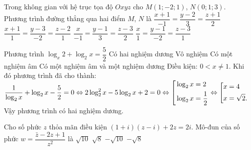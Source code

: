 \begin{ex}%
Trong không gian với hệ trục tọa độ $Oxyz$ cho $M\left(1;-2;1\right)$, $N\left( 0;1;3\right)$. Phương trình đường thẳng qua hai điểm $M$, $N$ là
\choice
{$\dfrac{x+1}{-1}=\dfrac{y-2}{3}=\dfrac{z+1}{2}$}
{$\dfrac{x + 1}{1}=\dfrac{y - 3}{-2}=\dfrac{z -2}{1}$}
{\True $\dfrac{x}{-1}=\dfrac{y-1}{3}=\dfrac{z-3}{2}$}
{$\dfrac{x}{1}=\dfrac{y-1}{-2}=\dfrac{z-3}{1}$}
\end{ex}

\begin{ex}%
Phương trình $\log_x 2 +\log_2 x=\dfrac{5}{2}$
\choice
{\True Có hai nghiệm dương}
{Vô nghiệm}
{Có một nghiệm âm}
{Có một nghiệm âm và một nghiệm dương}
\loigiai
{Điều kiện: $0<x\neq 1$. Khi đó phương trình đã cho thành:\\ $\dfrac{1}{\log_2x}+\log_2x-\dfrac{5}{2}=0\Leftrightarrow 2\log_2^2x-5\log_2x+2=0\Leftrightarrow\left[\begin{aligned}&\log_2x=2\\&\log_2x=\dfrac{1}{2}\end{aligned}\right.\Leftrightarrow\left[\begin{aligned}&x=4\\&x=\sqrt{2}.\end{aligned}\right.$\\Vậy phương trình có hai nghiệm dương.}
\end{ex}

\begin{ex}%
Cho số phức $z$ thỏa mãn điều kiện $(1+i)(z-i)+2z=2i$. Mô-đun của số phức $w=\dfrac{\bar{z}-2z+1}{z^2}$ là
\choice
{\True $\sqrt{10}$}
{$\sqrt{8}$}
{$-\sqrt{10}$}
{$-\sqrt{8}$}
\end{ex}

